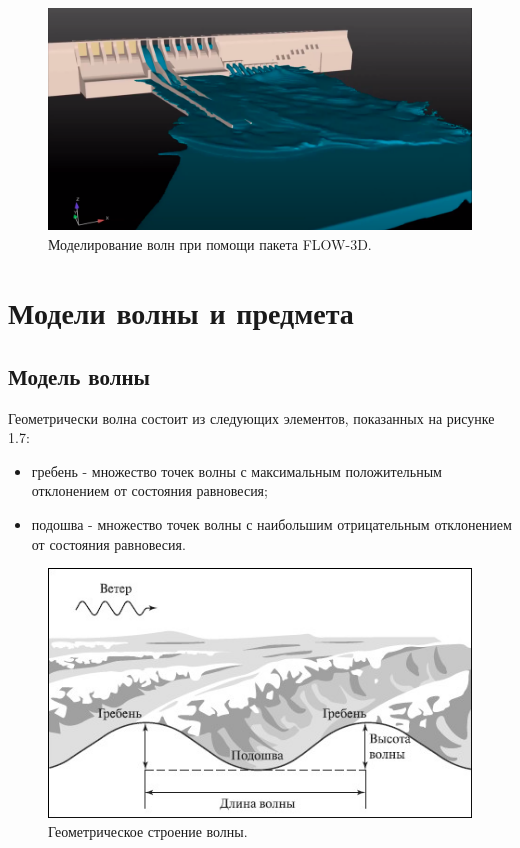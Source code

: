 \begin{figure}[H]
	\begin{center}
		\includegraphics[scale=0.2]{img/flow-3d.png}
	\end{center}
	\captionsetup{justification=centering}
	\caption{Моделирование волн при помощи пакета FLOW-3D.}
	\label{img:flow-3d}
\end{figure}

\section{Модели волны и предмета}

\subsection{Модель волны}

Геометрически волна состоит из следующих элементов, показанных на рисунке 1.7:

\begin{itemize}
	\item гребень - множество точек волны с максимальным положительным отклонением от состояния равновесия;
	\item подошва - множество точек волны с наибольшим отрицательным отклонением от состояния равновесия.
\end{itemize}

\begin{figure}[H]
	\begin{center}
		\includegraphics[scale=0.8]{img/wave-elements.jpg}
	\end{center}
	\captionsetup{justification=centering}
	\caption{Геометрическое строение волны.}
	\label{img:wave-elements}
\end{figure}

